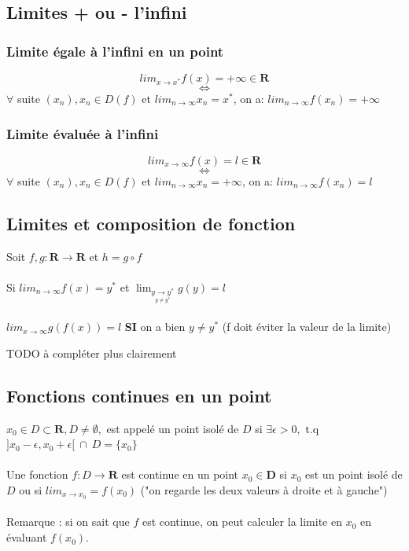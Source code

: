 \documentclass{article}
\begin{document}
\subsection{Limites + ou - l'infini}

\subsubsection{Limite égale à l'infini en un point}

\[ lim_{x\to{x^*}} f(x) = +\infty \in \mathbf{R} \]
\[ \Leftrightarrow \]
$ \forall $ suite $ (x_n), x_n \in D(f) $ et $ lim_{n\to\infty} x_n = x^* $, on a: $ lim_{n\to\infty} f(x_n) = +\infty $

\subsubsection{Limite évaluée à l'infini}

\[ lim_{x\to\infty} f(x) = l \in \mathbf{R} \]
\[ \Leftrightarrow \]
$ \forall $ suite $ (x_n), x_n \in D(f) $ et $ lim_{n\to\infty} x_n = +\infty $, on a: $ lim_{n\to\infty} f(x_n) = l $

\subsection{Limites et composition de fonction}

Soit $ f, g : \mathbf{R} \to \mathbf{R} $ et $ h = g \circ f $\\\\
Si $ lim_{n\to\infty} f(x) = y^*$ et $ \lim_{\underset{y \neq y^*}{y \rightarrow y^*}} g(y) = l $\\\\
$ lim_{x\to\infty} g(f(x)) = l $ \textbf{SI} on a bien $ y \neq y^* $ (f doit éviter la valeur de la limite)

TODO à compléter plus clairement

\subsection{Fonctions continues en un point}

$ x_0 \in D \subset \mathbf{R}, D \neq \emptyset, $ est appelé un point isolé de $ D $ si $ \exists \epsilon > 0, $ t.q $ ]x_0 - \epsilon, x_0 + \epsilon[\ \cap\ D = \{ x_0 \}$\\\\
Une fonction $ f : D \to \mathbf{R} $ est continue en un point $ x_0 \in \mathbf{D} $ si $ x_0 $ est un point isolé de $ D $ ou si $ lim_{x\to{x_0}} = f(x_0) $ ("on regarde les deux valeurs à droite et à gauche")\\\\
Remarque : si on sait que $ f $ est continue, on peut calculer la limite en $ x_0 $ en évaluant $ f(x_0) $.
\end{document}
